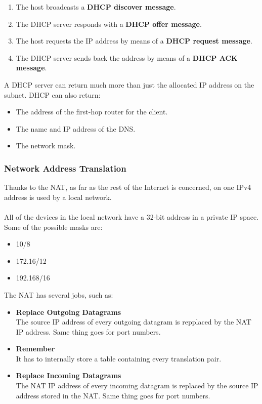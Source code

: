 \documentclass{article}
\begin{document}
\begin{enumerate}
	\item The host broadcasts a \textbf{DHCP discover message}.
	\item The DHCP server responds with a \textbf{DHCP offer message}.
	\item The host requests the IP address by means of a \textbf{DHCP request message}.
	\item The DHCP server sends back the address by means of a \textbf{DHCP ACK message}.
\end{enumerate}
A DHCP server can return much more than just the allocated IP address on the subnet. DHCP can also return:

\begin{itemize}
	\item The address of the first-hop router for the client.
	\item The name and IP address of the DNS.
	\item The network mask.
\end{itemize}

\subsubsection{Network Address Translation}
Thanks to the NAT, as far as the rest of the Internet is concerned, on one IPv4 address is used by a local network. \\ \\
All of the devices in the local network have a 32-bit address in a private IP space. Some of the possible masks are:

\begin{itemize}
	\item 10/8
	\item 172.16/12
	\item 192.168/16
\end{itemize}
The NAT has several jobs, such as:

\begin{itemize}
	\item \textbf{Replace Outgoing Datagrams}
	\vspace{.2cm} \\
	The source IP address of every outgoing datagram is repplaced by the NAT IP address. Same thing goes for port numbers.
	
	\item \textbf{Remember}
	\vspace{.2cm} \\
	It has to internally store a table containing every translation pair.
	
	\item \textbf{Replace Incoming Datagrams}
	\vspace{.2cm} \\
	The NAT IP address of every incoming datagram is replaced by the source IP address stored in the NAT. Same thing goes for port numbers.
\end{itemize}
\end{document}
